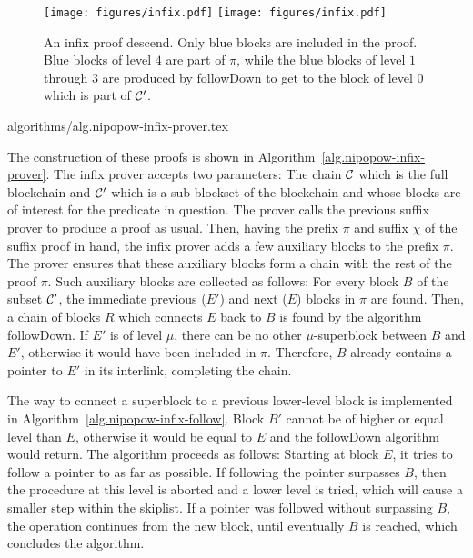 \begin{figure}[h]
    \caption{An infix proof descend. Only blue blocks are included in the proof.
    Blue blocks of level $4$ are part of $\pi$, while the blue blocks of level
    $1$ through $3$ are produced by followDown to get to the block of level $0$
    which is part of $\mathcal{C}'$.}
    \centering
    \iftwocolumn
        \texttt{[image: figures/infix.pdf]}
    \else
        \texttt{[image: figures/infix.pdf]}
    \fi
    \label{fig.infix}
\end{figure}

{algorithms/alg.nipopow-infix-prover.tex}


The construction of these proofs is shown in
Algorithm~\ref{alg.nipopow-infix-prover}. The infix prover accepts two
parameters: The chain $\mathcal{C}$ which is the full blockchain and $\mathcal{C}'$ which
is a sub-blockset of the blockchain and whose blocks are of interest for the
predicate in question. The prover calls the previous suffix prover to produce a
proof as usual. Then, having the prefix $\pi$ and suffix $\chi$ of the suffix
proof in hand, the infix prover adds a few auxiliary blocks to the prefix $\pi$.
The prover ensures that these auxiliary blocks form a chain with the rest of the
proof $\pi$. Such auxiliary blocks are collected as follows: For every block $B$
of the subset $\mathcal{C}'$, the immediate previous ($E'$) and next ($E$) blocks
in $\pi$ are found. Then, a chain of blocks $R$ which connects $E$ back to $B$
is found by the algorithm \textsf{followDown}. If $E'$ is of level $\mu$, there
can be no other $\mu$-superblock between $B$ and $E'$, otherwise it would have
been included in $\pi$. Therefore, $B$ already contains a pointer to $E'$ in its
interlink, completing the chain.

The way to connect a superblock to a previous lower-level block is implemented
in Algorithm~\ref{alg.nipopow-infix-follow}.  Block $B'$ cannot be of higher or
equal level than $E$, otherwise it would be equal to $E$ and the
\textsf{followDown} algorithm would return. The algorithm proceeds as follows:
Starting at block $E$, it tries to follow a pointer to as far as possible. If
following the pointer surpasses $B$, then the procedure at this level is aborted
and a lower level is tried, which will cause a smaller step within the skiplist.
If a pointer was followed without surpassing $B$, the operation continues from
the new block, until eventually $B$ is reached, which concludes the algorithm.

